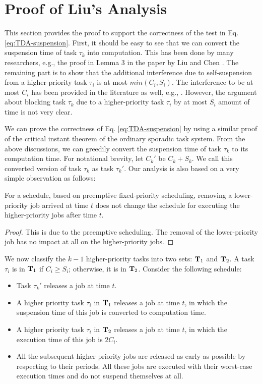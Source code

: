 
\section{Proof of Liu's Analysis}  

This section provides the proof to support the correctness of the test in Eq. \eqref{eq:TDA-suspension}. First, it should be easy to see that we can convert the suspension time of task $\tau_k$ into computation. This has been done by many researchers, e.g., the proof in Lemma 3 in the paper by Liu and Chen \cite{Liu_2014}. The remaining part is to show that the additional interference due to self-suspension from a higher-priority task $\tau_i$ is at most $min(C_i, S_i)$. The interference to be at most $C_i$ has been provided in the literature as well, e.g., \cite{Rajkumar_1990}\cite{Liu_2014}. However, the argument about blocking task $\tau_k$ due to a higher-priority task $\tau_i$ by at most $S_i$ amount of time is not very clear. 

We can prove the correctness of Eq. \eqref{eq:TDA-suspension} by using a similar proof of the critical instant theorem of the ordinary sporadic task system. From the above discussions, we can greedily convert the suspension time of task $\tau_k$ to its computation time. For notational brevity, let $C_k'$ be $C_k + S_k$. We call this converted version of task $\tau_k$ as task $\tau_k'$. Our analysis is also based on a very simple observation as follows:
\begin{lemma}
\label{lemma:remove-lower-priority}
  For a schedule, based on preemptive fixed-priority scheduling, removing a lower-priority job arrived at time $t$ does not change the schedule for executing the higher-priority jobs after time $t$.
\end{lemma}
\begin{proof}
  This is due to the preemptive scheduling. The removal of the lower-priority job has no impact at all on the higher-priority jobs.
\end{proof}

We now classify the $k-1$ higher-priority tasks into two sets: ${\bf T}_1$ and ${\bf T}_2$. A task $\tau_i$ is in ${\bf T}_1$ if $C_i \geq S_i$; otherwise, it is in ${\bf T}_2$.
Consider the following schedule:
\begin{itemize}
\item Task $\tau_k'$ releases a job at time $t$.
\item A higher priority task $\tau_i$ in ${\bf T}_1$ releases a job at time $t$, in which the suspension time of this job is converted to computation time.
\item A higher priority task $\tau_i$ in ${\bf T}_2$ releases a job at time $t$, in which the execution time of this job is $2C_i$.
\item All the subsequent higher-priority jobs are released as early as possible by respecting to their periods. All these jobs are executed with their worst-case execution times and do not suspend themselves at all.
\end{itemize}

